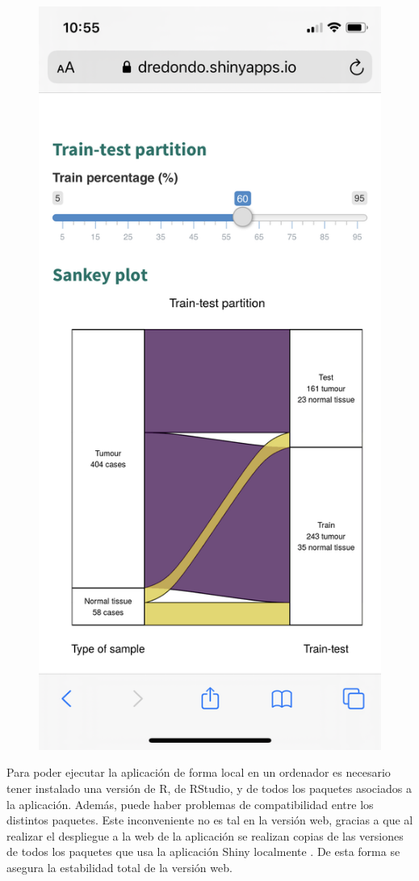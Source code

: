 \begin{figure}[H]
\begin{minipage}{.5\textwidth}
	 \includegraphics[width=.75\textwidth]{figuras/42_app_iphone2.png}
	\end{minipage}
\end{figure}

Para poder ejecutar la aplicación de forma local en un ordenador es necesario tener instalado una versión de R, de RStudio, y de todos los paquetes asociados a la aplicación. Además, puede haber problemas de compatibilidad entre los distintos paquetes. Este inconveniente no es tal en la versión web, gracias a que al realizar el despliegue a la web de la aplicación se realizan copias de las versiones de todos los paquetes que usa la aplicación Shiny localmente \cite{Shinyapps.ioteam2020}. De esta forma se asegura la estabilidad total de la versión web.\\

